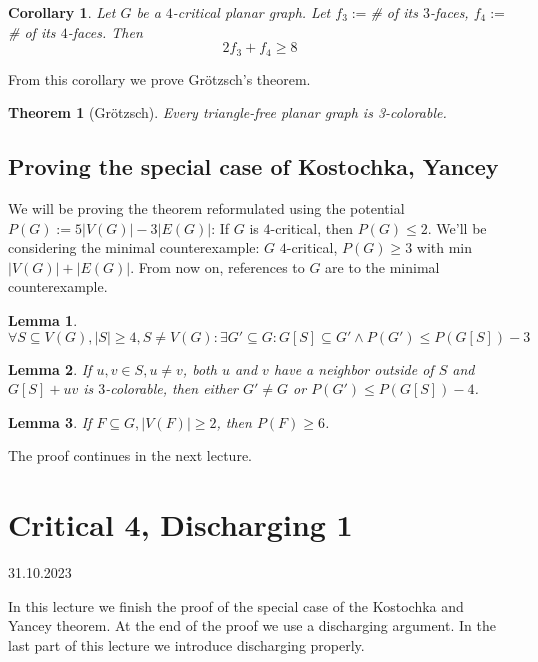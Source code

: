 \documentclass{article}
\newtheorem*{theorem}{Theorem}
\newtheorem*{lemma}{Lemma}
\newtheorem*{corollary}{Corollary}
\begin{document}
\begin{corollary}
	Let $G$ be a $4$-critical planar graph. Let $f_3 := $\# of its
	$3$-faces, $f_4 := $\# of its $4$-faces. Then
	$$ 2f_3 + f_4 \ge 8 $$
\end{corollary}

\noindent
From this corollary we prove Grötzsch's theorem.

\begin{theorem}[Grötzsch]
	Every triangle-free planar graph is 3-colorable.
\end{theorem}

\subsection*{Proving the special case of Kostochka, Yancey}

We will be proving the theorem reformulated using the potential $P(G) :=
5|V(G)| - 3|E(G)|$: If $G$ is $4$-critical, then $P(G) \le 2$. We'll be
considering the minimal counterexample: $G$ $4$-critical, $P(G) \ge 3$ with
min $|V(G)| + |E(G)|$. From now on, references to $G$ are to the minimal
counterexample.

\begin{lemma}
	$\forall S \subseteq V(G), |S| \ge 4, S \neq V(G):
	\exists G' \subseteq G: G[S] \subseteq G' \land P(G') \le P(G[S]) - 3$
\end{lemma}

\begin{lemma}
	If $u,v \in S, u \neq v$, both $u$ and $v$ have a neighbor outside of
	$S$ and $G[S] + uv$ is $3$-colorable, then either $G' \neq G$ or $P(G')
	\le P(G[S])-4$.
\end{lemma}

\begin{lemma}
	If $F \subseteq G, |V(F)| \ge 2$, then $P(F) \ge 6$.
\end{lemma}

\noindent
The proof continues in the next lecture.


\newpage
\section{Critical 4, Discharging 1} %
31.10.2023

\noindent
In this lecture we finish the proof of the special case of the Kostochka and
Yancey theorem. At the end of the proof we use a discharging argument. In the
last part of this lecture we introduce discharging properly.
\end{document}
